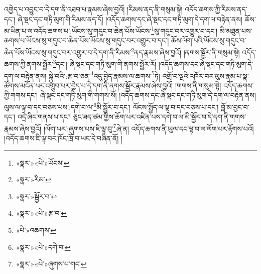འགྱེད་པ་འབྱུང་བ་དེ་དག་ནི་འཐབ་པ་རྣམས་ཞེས་བྱའོ། །རིམས་ནད་ནི་གསུམ་སྟེ། འདོད་ཆགས་ཀྱི་རིམས་ནད་དང་། ཞེ་སྡང་དང་གཏི་མུག་གི་རིམས་ནད་དོ། །འདོད་ཆགས་དང་ཞེ་སྡང་དང་གཏི་མུག་དེ་དག་ལ་བརྟེན་ནས། ཆོས་མ་ཡིན་པ་ལ་འདོད་ཆགས་པ་:ཡོངས་སུ་གདུང་བ་ཆེན་པོས་ཡོངས་\footnote{«སྣར་»«པེ་»ཡོངས་}སུ་གདུང་བར་འགྱུར་བ་དང་། མི་མཐུན་པས་ཆགས་པ་ཡོངས་སུ་གདུང་བ་ཆེན་པོས་ཡོངས་སུ་གདུང་བར་འགྱུར་བ་དང་། ཆོས་ལོག་པའི་ཡོངས་སུ་གདུང་བ་ཆེན་པོས་ཡོངས་སུ་གདུང་བར་འགྱུར་བ་དེ་དག་ནི་རིམས་\footnote{«སྣར་»རིམ་}ནད་རྣམས་ཞེས་བྱའོ། །ནགས་སྦྱོར་ནི་གསུམ་སྟེ། འདོད་ཆགས་ཀྱི་ནགས་སྦྱོར་\footnote{«སྣར་»སྦྱོར་བ་}དང་། ཞེ་སྡང་དང་གཏི་མུག་གི་ནགས་སྦྱོར་རོ། །འདོད་ཆགས་དང་ཞེ་སྡང་དང་གཏི་མུག་དེ་དག་ལ་བརྟེན་ནས། སྐྱེ་བའི་:རྩ་བ་ཅན་\footnote{«སྣར་»«པེ་»རྩ་བ་}འདུ་བྱེད་རྣམས་ལ་ཆགས་\footnote{«པེ་»འཆགས་}ཏེ། འགྲོ་བ་ལྔའི་འཁོར་བར་ལུས་རྣམ་པ་སྣ་ཚོགས་མངོན་པར་འགྲུབ་པར་བྱེད་པ་དེ་དག་ནི་ནགས་སྦྱོར་རྣམས་ཞེས་བྱའོ། །གགས་ནི་གསུམ་སྟེ། འདོད་ཆགས་ཀྱི་གགས་དང་། ཞེ་སྡང་དང་གཏི་མུག་གི་གགས་སོ། །འདོད་ཆགས་དང་ཞེ་སྡང་དང་གཏི་མུག་དེ་དག་ལ་བརྟེན་ནས། ལུས་ལ་ལྟ་བ་དང་བཅས་པས་:དགེ་བ་ལ་\footnote{«སྣར་»«པེ་»དགེ་བ་}མི་སྦྱོར་བ་དང་། ལོངས་སྤྱོད་ལ་ལྟ་བ་དང་བཅས་པ་དང་། བློ་མ་བྱང་བ་དང་། འདྲེ་ཞིང་གནས་པ་དང་། ཅུང་ཟད་ཙམ་གྱིས་ཆོག་པར་འཛིན་པས་དགེ་བ་ལ་མི་སྦྱོར་བ་དེ་དག་ནི་གགས་རྣམས་ཞེས་བྱའོ། །ལོག་པར་:ཞུགས་པས་ཇི་ལྟ་བུ་\footnote{«སྣར་»«པེ་»ཞུགས་པ་གང་}ཞེ་ན། འདོད་ཆགས་ནི་ཡུལ་དང་ལྟ་བ་ལ་ལོག་པར་རྟོགས་པའོ། །འདོད་ཆགས་ཇི་ལྟ་བར་ཁོང་ཁྲོ་བ་ཡང་དེ་བཞིན་ནོ། །
